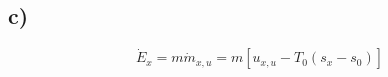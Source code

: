

\subsection*{c)}

\[
\dot{E}_{x} = m \dot{m}_{x,u} = m \left[ u_{x,u} - T_{0} (s_{x} - s_{0}) \right]
\]